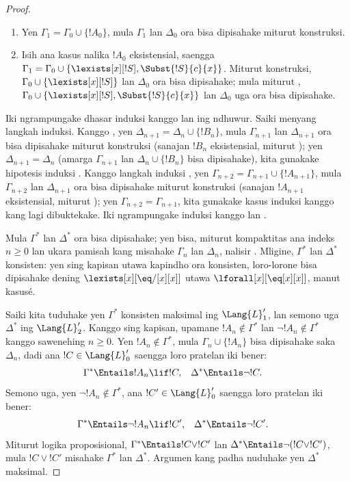 \documentclass[../../../include/open-logic-section]{subfiles}
\begin{document}
\begin{proof}
\begin{enumerate}
  mula $\Gamma_1 = \Gamma_0$ lan  padha karo
  ;
\item Yen $\Gamma_1 = \Gamma_0 \cup\{ !A_0\}$, mula $\Gamma_1$
  lan $\Delta_0$ ora bisa dipisahake miturut konstruksi.
\item Isih ana kasus nalika $!A_0$ eksistensial, saengga
  $\Gamma_1 = \Gamma_0 \cup \{ \lexists[x][!S], \Subst{!S}{c}{x}
  \}$. Miturut konstruksi, $\Gamma_0 \cup \{ \lexists[x][!S]\}$
  lan $\Delta_0$ ora bisa dipisahake; mula miturut
  , $\Gamma_0 \cup \{ \lexists[x][!S],
  \Subst{!S}{c}{x} \}$ lan $\Delta_0$ uga ora bisa dipisahake.
\end{enumerate}
Iki ngrampungake dhasar induksi kanggo  lan
 ing ndhuwur. Saiki menyang langkah induksi.
Kanggo , yen $\Delta_{n+1} = \Delta_n \cup
\{ !B_n \}$, mula $\Gamma_{n+1}$ lan $\Delta_{n+1}$ ora bisa
dipisahake miturut konstruksi (sanajan $!B_n$ eksistensial,
miturut ); yen $\Delta_{n+1} = \Delta_n$
(amarga $\Gamma_{n+1}$ lan $\Delta_n \cup \{!B_n\}$ bisa
dipisahake), kita gunakake hipotesis induksi .
Kanggo langkah induksi , yen
$\Gamma_{n+2} = \Gamma_{n+1} \cup \{!A_{n+1} \}$, mula
$\Gamma_{n+2}$ lan $\Delta_{n+1}$ ora bisa dipisahake
miturut konstruksi (sanajan $!A_{n+1}$ eksistensial,
miturut ); yen
$\Gamma_{n+2} = \Gamma_{n+1}$, kita gunakake kasus induksi
kanggo  kang lagi dibuktekake. Iki ngrampungake
induksi kanggo  lan .

Mula $\Gamma^*$ lan $\Delta^*$ ora bisa dipisahake; yen bisa,
miturut kompaktitas ana indeks $n \ge 0$ lan ukara pamisah kang misahake
$\Gamma_n$ lan $\Delta_n$, nalisir .
Mligine, $\Gamma^*$ lan $\Delta^*$ konsisten:
yen sing kapisan utawa kapindho ora konsisten,
loro-lorone bisa dipisahake dening
$\lexists[x][\eq/[x][x]]$ utawa
$\lforall[x][\eq[x][x]]$, manut kasusé.

Saiki kita tuduhake yen $\Gamma^*$ konsisten maksimal ing
$\Lang{L}'_1$, lan semono uga $\Delta^*$ ing $\Lang{L}'_2$.
Kanggo sing kapisan, upamane $!A_n \notin \Gamma^*$ lan
$\lnot !A_n \notin \Gamma^*$ kanggo sawenehing $n \ge 0$.
Yen $!A_n \notin \Gamma^*$, mula $\Gamma_n \cup \{!A_n \}$
bisa dipisahake saka $\Delta_n$, dadi ana $!C \in
\Lang{L}'_0$ saengga loro pratelan iki bener:
\begin{align*}
  \Gamma^* & \Entails !A_n \lif !C, &
  \Delta^* & \Entails \lnot !C.
\end{align*}
Semono uga, yen $\lnot !A_n \notin \Gamma^*$, ana $!C' \in
\Lang{L}'_0$ saengga loro pratelan iki bener:
\begin{align*}
  \Gamma^* & \Entails \lnot !A_n \lif !C', &
  \Delta^* & \Entails \lnot !C'.
\end{align*}
Miturut logika proposisional, $\Gamma^* \Entails !C \lor !C'$
lan $\Delta^* \Entails \lnot (!C \lor !C')$, mula $!C \lor
!C'$ misahake $\Gamma^*$ lan $\Delta^*$. Argumen kang padha
nuduhake yen $\Delta^*$ maksimal.


\end{proof}
\end{document}
